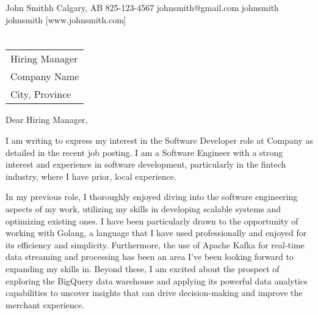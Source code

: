 \documentclass[letterpaper]{resume_config}
\begin{document}
\Header
    {John Smithh} %
    {Calgary, AB} %
    {825-123-4567} %
    {johnsmith@gmail.com} %
    {johnsmith} %
    {johnsmith} %
    [www.johnsmith.com] %

\section{}


\vspace{0.5in}
\begin{tabular}{@{} l}
	Hiring Manager \\
	Company Name \\
	City, Province \\
\end{tabular}

\bigskip %
\bigskip %

Dear Hiring Manager,

\bigskip %


I am writing to express my interest in the Software Developer role at Company as detailed in the recent job posting. I am a Software Engineer with a strong interest and experience in software development, particularly in the fintech industry, where I have prior, local experience.

\bigskip

In my previous role, I thoroughly enjoyed diving into the software engineering aspects of my work, utilizing my skills in developing scalable systems and optimizing existing ones. I have been particularly drawn to the opportunity of working with Golang, a language that I have used professionally and enjoyed for its efficiency and simplicity. Furthermore, the use of Apache Kafka for real-time data streaming and processing has been an area I've been looking forward to expanding my skills in. Beyond these, I am excited about the prospect of exploring the BigQuery data warehouse and applying its powerful data analytics capabilities to uncover insights that can drive decision-making and improve the merchant experience.
\end{document}
